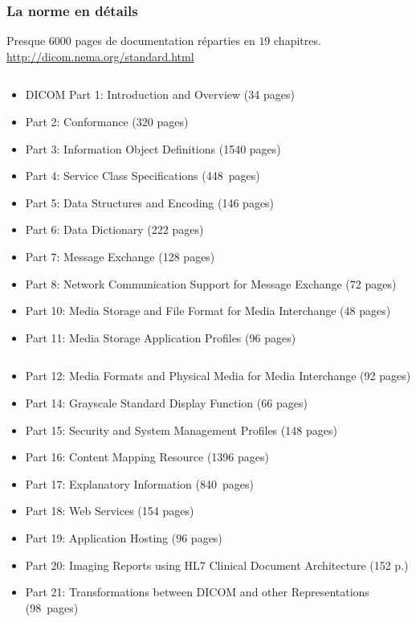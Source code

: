 	\frame
	{
		\frametitle{La norme en d\'etails}
		Presque $6000$ pages de documentation r\'eparties en $19$ chapitres.
		\url{http://dicom.nema.org/standard.html}		
		
		\begin{columns}\begin{scriptsize}
	  	\begin{column}[t]{0.5\linewidth}
			\begin{itemize}
				\item DICOM Part 1: Introduction and Overview (34 pages)
				\item Part 2: Conformance (320 pages)
				\item Part 3: Information Object Definitions (1540 pages)
				\item Part 4: Service Class Specifications (448~pages)
				\item Part 5: Data Structures and Encoding (146 pages)
				\item Part 6: Data Dictionary (222 pages)
				\item Part 7: Message Exchange (128 pages)
				\item Part 8: Network Communication Support for Message Exchange (72 pages)
				\item Part 10: Media Storage and File Format for Media Interchange (48 pages)
				\item Part 11: Media Storage Application Profiles (96 pages)
			\end{itemize}
	  	\end{column}
	  	\begin{column}[t]{0.5\linewidth}
			\begin{itemize}
				\item Part 12: Media Formats and Physical Media for Media Interchange (92 pages)
				\item Part 14: Grayscale Standard Display Function (66 pages)
				\item Part 15: Security and System Management Profiles (148 pages)
				\item Part 16: Content Mapping Resource (1396 pages)
				\item Part 17: Explanatory Information (840~pages)
				\item Part 18: Web Services (154 pages)
				\item Part 19: Application Hosting (96 pages)
				\item Part 20: Imaging Reports using HL7 Clinical Document Architecture (152 p.)
				\item Part 21: Transformations between DICOM and other Representations (98~pages)
			\end{itemize}
	  	\end{column}\end{scriptsize}
	  	\end{columns}
	}

